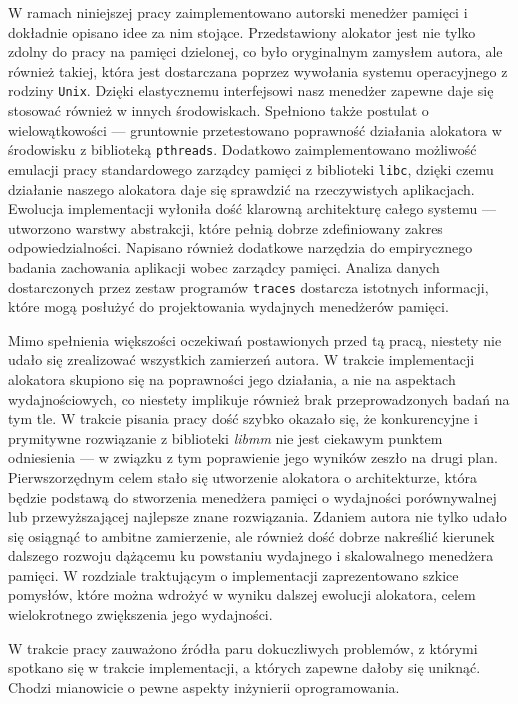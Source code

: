 \documentclass[12pt,a4paper,titlepage,twoside]{mwart}
\begin{document}
W ramach niniejszej pracy zaimplementowano autorski menedżer pamięci i
dokładnie opisano idee za nim stojące. Przedstawiony alokator jest nie tylko
zdolny do pracy na pamięci dzielonej, co było oryginalnym zamysłem autora, ale
również takiej, która jest dostarczana poprzez wywołania systemu operacyjnego z
rodziny \texttt{Unix}. Dzięki elastycznemu interfejsowi nasz menedżer zapewne
daje się stosować również w innych środowiskach. Spełniono także postulat o
wielowątkowości --- gruntownie przetestowano poprawność działania alokatora w
środowisku z biblioteką \texttt{pthreads}. Dodatkowo zaimplementowano możliwość
emulacji pracy standardowego zarządcy pamięci z biblioteki \texttt{libc},
dzięki czemu działanie naszego alokatora daje się sprawdzić na rzeczywistych
aplikacjach.  Ewolucja implementacji wyłoniła dość klarowną architekturę całego
systemu --- utworzono warstwy abstrakcji, które pełnią dobrze zdefiniowany
zakres odpowiedzialności. Napisano również dodatkowe narzędzia do empirycznego
badania zachowania aplikacji wobec zarządcy pamięci. Analiza danych
dostarczonych przez zestaw programów \texttt{traces} dostarcza istotnych
informacji, które mogą posłużyć do projektowania wydajnych menedżerów pamięci.

Mimo spełnienia większości oczekiwań postawionych przed tą pracą, niestety nie
udało się zrealizować wszystkich zamierzeń autora. W trakcie implementacji
alokatora skupiono się na poprawności jego działania, a nie na aspektach
wydajnościowych, co niestety implikuje również brak przeprowadzonych badań na
tym tle. W trakcie pisania pracy dość szybko okazało się, że konkurencyjne i
prymitywne rozwiązanie z biblioteki \textit{libmm} nie jest ciekawym punktem
odniesienia --- w związku z tym poprawienie jego wyników zeszło na drugi plan.
Pierwszorzędnym celem stało się utworzenie alokatora o architekturze, która
będzie podstawą do stworzenia menedżera pamięci o wydajności porównywalnej lub
przewyższającej najlepsze znane rozwiązania. Zdaniem autora nie tylko udało się
osiągnąć to ambitne zamierzenie, ale również dość dobrze nakreślić kierunek
dalszego rozwoju dążącemu ku powstaniu wydajnego i skalowalnego menedżera
pamięci. W rozdziale traktującym o implementacji zaprezentowano szkice
pomysłów, które można wdrożyć w wyniku dalszej ewolucji alokatora, celem
wielokrotnego zwiększenia jego wydajności.

W trakcie pracy zauważono źródła paru dokuczliwych problemów, z którymi
spotkano się w trakcie implementacji, a których zapewne dałoby się uniknąć.
Chodzi mianowicie o pewne aspekty inżynierii oprogramowania.
\end{document}
